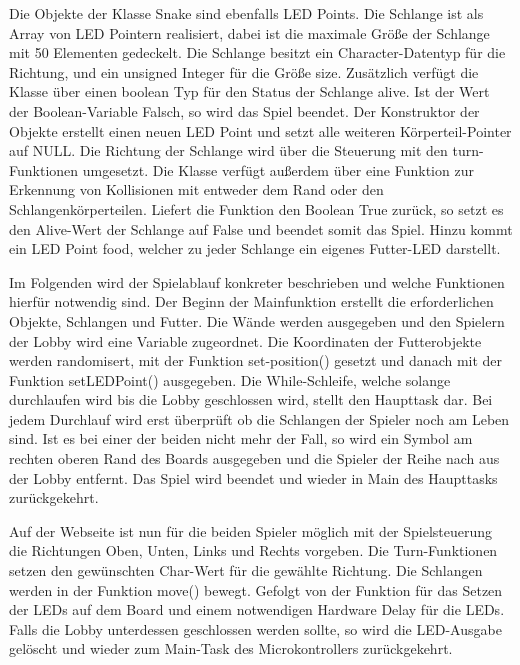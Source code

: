 \documentclass[12pt,a4paper]{article}
\begin{document}
Die Objekte der Klasse Snake sind ebenfalls LED Points. Die Schlange ist als Array von LED Pointern realisiert, dabei ist die maximale Größe der Schlange mit 50 Elementen gedeckelt. Die Schlange besitzt ein Character-Datentyp für die Richtung, und ein unsigned Integer für die Größe \glqq size\grqq{}. Zusätzlich verfügt die Klasse über einen boolean Typ für den Status der Schlange \glqq alive\grqq{}. Ist der Wert der Boolean-Variable Falsch, so wird das Spiel beendet. Der Konstruktor der Objekte erstellt einen neuen LED Point und setzt alle weiteren Körperteil-Pointer auf NULL. Die Richtung der Schlange wird über die Steuerung mit den turn-Funktionen umgesetzt. Die Klasse verfügt außerdem über eine Funktion zur Erkennung von Kollisionen mit entweder dem Rand oder den Schlangenkörperteilen. Liefert die Funktion den Boolean True zurück, so setzt es den Alive-Wert der Schlange auf False und beendet somit das Spiel. Hinzu kommt ein LED Point \glqq food\grqq{}, welcher zu jeder Schlange ein eigenes Futter-LED darstellt. 

Im Folgenden wird der Spielablauf konkreter beschrieben und welche Funktionen hierfür notwendig sind. Der Beginn der Mainfunktion erstellt die erforderlichen Objekte, Schlangen und Futter. Die Wände werden ausgegeben und den Spielern der Lobby wird eine Variable zugeordnet. Die Koordinaten der Futterobjekte werden randomisert, mit der Funktion \glqq set-position()\grqq{} gesetzt und danach mit der Funktion \glqq setLEDPoint()\grqq{} ausgegeben. Die While-Schleife, welche solange durchlaufen wird bis die Lobby geschlossen wird, stellt den Haupttask dar. Bei jedem Durchlauf wird erst überprüft ob die Schlangen der Spieler noch am Leben sind. Ist es bei einer der beiden nicht mehr der Fall, so wird ein Symbol am rechten oberen Rand des Boards ausgegeben und die Spieler der Reihe nach aus der Lobby entfernt. Das Spiel wird beendet und wieder in Main des Haupttasks zurückgekehrt.

Auf der Webseite ist nun für die beiden Spieler möglich mit der Spielsteuerung die Richtungen Oben, Unten, Links und Rechts vorgeben. Die Turn-Funktionen setzen den gewünschten Char-Wert für die gewählte Richtung. Die Schlangen werden in der Funktion \glqq move()\grqq{} bewegt. Gefolgt von der Funktion für das Setzen der LEDs auf dem Board und einem notwendigen Hardware Delay für die LEDs. Falls die Lobby unterdessen geschlossen werden sollte, so wird die LED-Ausgabe gelöscht und wieder zum Main-Task des Microkontrollers zurückgekehrt.
\end{document}
